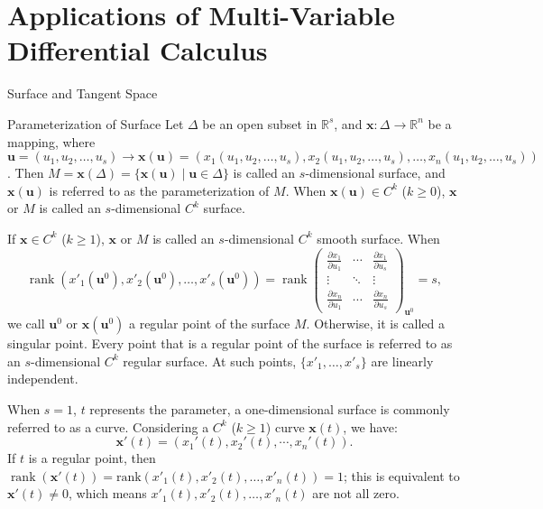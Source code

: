 \documentclass[11pt]{../../TexTemplate/elegantbook}
\begin{document}
\section{Applications of Multi-Variable Differential Calculus}
\begin{leftbarTitle}{Surface and Tangent Space}\end{leftbarTitle}
\begin{definition}{Parameterization of Surface}
    Let \( \Delta \) be an open subset in \( \mathbb{R}^s \), 
    and \( \mathbf{x}: \Delta \to \mathbb{R}^n \) be a mapping, 
    where \( \mathbf{u} = (u_1, u_2, \dots, u_s) \to \mathbf{x}(\mathbf{u}) = 
    (x_1(u_1, u_2, \dots, u_s), x_2(u_1, u_2, \dots, u_s), \dots, x_n(u_1, u_2, \dots, u_s)) \). 
    Then \( M = \mathbf{x}(\Delta) = \{ \mathbf{x}(\mathbf{u}) \mid \mathbf{u} \in \Delta \} \) 
    is called an \( s \)-dimensional surface, and \( \mathbf{x}(\mathbf{u}) \) 
    is referred to as the parameterization of \( M \). 
    When \( \mathbf{x}(\mathbf{u}) \in C^k \) (\( k \geq 0 \)), 
    \( \mathbf{x} \) or \( M \) is called an \( s \)-dimensional \( C^k \) surface. 
    
    If \( \mathbf{x} \in C^k \) (\( k \geq 1 \)), \( \mathbf{x} \) or \( M \) 
    is called an \( s \)-dimensional \( C^k \) smooth surface. When
    \[
    \operatorname{rank}(x'_1(\mathbf{u}^0), x'_2(\mathbf{u}^0), \dots, x'_s(\mathbf{u}^0)) = 
    \operatorname{rank}
    \begin{pmatrix}
    \frac{\partial x_1}{\partial u_1} & \cdots & \frac{\partial x_1}{\partial u_s} \\
    \vdots & \ddots & \vdots \\
    \frac{\partial x_n}{\partial u_1} & \cdots & \frac{\partial x_n}{\partial u_s}
    \end{pmatrix}_{\mathbf{u}^0}
    = s,
    \]
    we call \( \mathbf{u}^0 \) or \( \mathbf{x}(\mathbf{u}^0) \) a regular point of the surface \( M \). 
    Otherwise, it is called a singular point. 
    Every point that is a regular point of the surface is referred to as an \( s \)-dimensional \( C^k \) regular surface. 
    At such points, \( \{x'_1, \dots, x'_s\} \) are linearly independent.
\end{definition}

When \( s = 1 \), \( t \) represents the parameter, a one-dimensional surface is commonly referred to as a curve. 
Considering a \( C^k \) (\( k \geq 1 \)) curve \( \mathbf{x}(t) \), we have:
\[
\mathbf{x}'(t) = \left( x_{1}'(t), x_{2}'(t), \cdots, x_{n}'(t) \right) .
\]
If \( t \) is a regular point, then 
\( \operatorname{rank}(\mathbf{x}'(t)) = \text{rank}(x'_1(t), x'_2(t), \dots, x'_n(t)) = 1 \); 
this is equivalent to \( \mathbf{x}'(t) \neq 0 \), which means \( x'_1(t), x'_2(t), \dots, x'_n(t) \) are not all zero.
\end{document}
